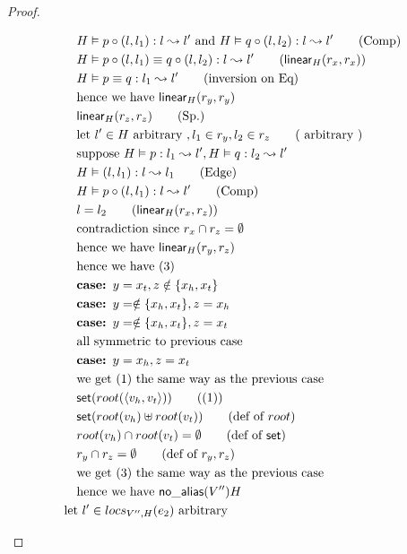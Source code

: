 \documentclass[11pt]{article}
\newcommand{\ms}[1]{\ensuremath{\mathsf{#1}}}
\newcommand{\na}[1]{\mathsf{no\_alias}(#1)}
\begin{document}
\begin{proof}
\begin{description}
\begin{align*}
  &\quad H \vDash p \circ (l,l_1) : l \leadsto l' \text{ and }  H \vDash q \circ (l,l_2) : l \leadsto l' \tag{Comp}\\
  &\quad H \vDash p \circ (l,l_1) \equiv q \circ (l,l_2) : l \leadsto l' \tag{$\ms{linear}_H(r_x,r_x)$}\\
  &\quad H \vDash p \equiv q : l_1 \leadsto l' \tag{inversion on Eq}\\
  &\quad \text{hence we have } \ms{linear}_H(r_y,r_y)\\
  &\quad \ms{linear}_H(r_z,r_z) \tag{Sp.}\\
  &\quad \text{let } l' \in H \text{ arbitrary }, l_1 \in r_y, l_2 \in r_z \tag{ arbitrary }\\
  &\quad \text{suppose } H \vDash p : l_1 \leadsto l', H \vDash q : l_2 \leadsto l'\\
  &\quad H \vDash (l,l_1) : l \leadsto l_1 \tag{Edge}\\
  &\quad H \vDash p \circ (l,l_1) : l \leadsto l' \tag{Comp}\\
  &\quad l = l_2 \tag{$\ms{linear}_H(r_x,r_z)$}\\
  &\quad \text{contradiction since } r_x \cap r_z = \emptyset\\
  &\quad \text{hence we have } \ms{linear}_H(r_y,r_z)\\
  &\quad \text{hence we have (3)}\\
  &\quad\textbf{case: } y = x_t, z \notin \{x_h,x_t\}\\
  &\quad\textbf{case: } y = \notin \{x_h,x_t\}, z = x_h\\
  &\quad\textbf{case: } y = \notin \{x_h,x_t\}, z = x_t\\
  &\quad \text{all symmetric to previous case}\\
  &\quad\textbf{case: } y = x_h, z = x_t\\
  &\quad \text{we get (1) the same way as the previous case}\\
  &\quad \ms{set}(root(\pairexcst{v_h}{v_t})) \tag{(1)}\\
  &\quad \ms{set}(root(v_h) \uplus root(v_t)) \tag{def of $root$}\\
  &\quad root(v_h) \cap root(v_t) = \emptyset \tag{def of $\ms{set}$}\\
  &\quad r_y \cap r_z = \emptyset \tag{def of $r_y,r_z$}\\
  &\quad \text{we get (3) the same way as the previous case}\\
  &\quad \text{hence we have } \na{V''}{H}\\
  &\text{let } l' \in locs_{V'',H}(e_2) \text{ arbitrary }\\

\end{align*}
\end{description}
\end{proof}
\end{document}

